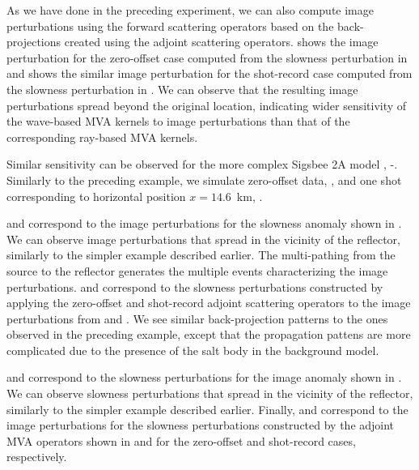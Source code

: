 As we have done in the preceding experiment, we can also compute image
perturbations using the forward scattering operators based on the
back-projections created using the adjoint scattering operators.
 shows the image perturbation for the
zero-offset case computed from the slowness perturbation in
 and  shows the similar
image perturbation for the shot-record case computed from the slowness
perturbation in . We can observe that the
resulting image perturbations spread beyond the original location,
indicating wider sensitivity of the wave-based MVA kernels to image
perturbations than that of the corresponding ray-based MVA kernels.


Similar sensitivity can be observed for the more complex Sigsbee 2A
model \cite[]{SEG-2002-21222125},
-. Similarly to the preceding
example, we simulate zero-offset data, , and one
shot corresponding to horizontal position $x=14.6$~km,
.

 and  correspond to the
image perturbations for the slowness anomaly shown in
. We can observe image perturbations that spread in
the vicinity of the reflector, similarly to the simpler example
described earlier. The multi-pathing from the source to the reflector
generates the multiple events characterizing the image
perturbations.
%
 and  correspond to the
slowness perturbations constructed by applying the zero-offset and
shot-record adjoint scattering operators to the image perturbations
from  and . We see similar
back-projection patterns to the ones observed in the preceding
example, except that the propagation pattens are more complicated due
to the presence of the salt body in the background model.

 and  correspond to the
slowness perturbations for the image anomaly shown in
. We can observe slowness perturbations that spread
in the vicinity of the reflector, similarly to the simpler example
described earlier.  
%
Finally,  and  correspond
to the image perturbations for the slowness perturbations constructed
by the adjoint MVA operators shown in  and
 for the zero-offset and shot-record cases,
respectively.

